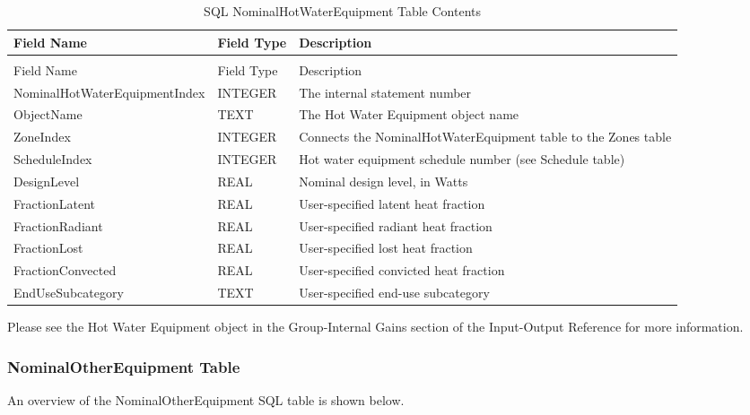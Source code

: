 {\scriptsize
\begin{longtable}[c]{>{\raggedright}p{1.5in}>{\raggedright}p{1.5in}>{\raggedright}p{2.99in}}
\caption{SQL NominalHotWaterEquipment Table Contents \label{table:table-20.-sql-nominalhotwaterequipment-table}} \tabularnewline
\toprule 
Field Name & Field Type & Description \tabularnewline
\midrule
\endfirsthead

\caption[]{SQL NominalHotWaterEquipment Table Contents} \tabularnewline
\toprule 
Field Name & Field Type & Description \tabularnewline
\midrule
\endhead

Nominal\-Hot\-Water\-Equipment\-Index & INTEGER & The internal statement number \tabularnewline
ObjectName & TEXT & The Hot Water Equipment object name \tabularnewline
ZoneIndex & INTEGER & Connects the NominalHotWaterEquipment table to the Zones table \tabularnewline
ScheduleIndex & INTEGER & Hot water equipment schedule number (see Schedule table) \tabularnewline
DesignLevel & REAL & Nominal design level, in Watts \tabularnewline
FractionLatent & REAL & User-specified latent heat fraction \tabularnewline
FractionRadiant & REAL & User-specified radiant heat fraction \tabularnewline
FractionLost & REAL & User-specified lost heat fraction \tabularnewline
FractionConvected & REAL & User-specified convicted heat fraction \tabularnewline
EndUseSubcategory & TEXT & User-specified end-use subcategory \tabularnewline
\bottomrule
\end{longtable}}

Please see the Hot Water Equipment object in the Group-Internal Gains section of the Input-Output Reference for more information.

\subsubsection{NominalOtherEquipment Table}

An overview of the NominalOtherEquipment SQL table is shown below.


